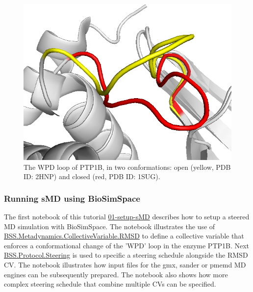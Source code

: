\begin{figure}[htp]
\includegraphics[width=\linewidth]{LIVECOMS/03_steered_md/open-close.png}
\caption{The WPD loop of PTP1B, in two conformations: open (yellow, PDB ID: 2HNP) and closed (red, PDB ID: 1SUG).}
\label{fig:ptp1b}
\end{figure}

\subsubsection{Running sMD using BioSimSpace}

The first notebook of this tutorial \href{https://github.com/OpenBioSim/BioSimSpaceTutorials/blob/main/03_steered_md/01_setup_sMD.ipynb}{01-setup-sMD} describes how to setup a steered MD simulation with BioSimSpace. 
The notebook illustrates the use of \href{https://biosimspace.openbiosim.org/api/generated/BioSimSpace.Metadynamics.CollectiveVariable.RMSD.html#BioSimSpace.Metadynamics.CollectiveVariable.RMSD}{BSS.Metadynamics.CollectiveVariable.RMSD} to define a collective variable that enforces a conformational change of the 'WPD' loop in the enzyme PTP1B. 
Next \href{https://biosimspace.openbiosim.org/api/generated/BioSimSpace.Protocol.Steering.html#BioSimSpace.Protocol.Steering}{BSS.Protocol.Steering} is used to specific a steering schedule alongside the RMSD CV. The notebook illustrates how input files for the gmx, sander or pmemd MD engines can be subsequently prepared. The notebook also shows how more complex steering schedule that combine multiple CVs can be specified. 


